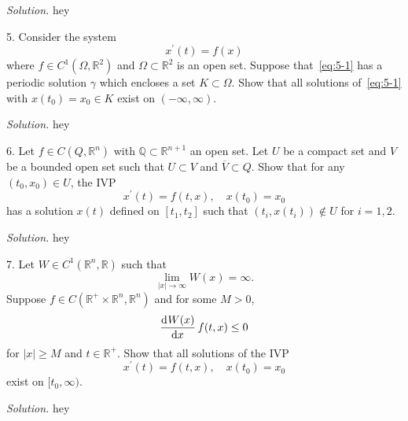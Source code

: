 \documentclass{article}
\newcommand{\Q}{\mathbb{Q}}
\newcommand{\R}{\mathbb{R}}
\begin{document}
\textit{Solution.}
hey

\newpage

5. Consider the system
%
\begin{equation}
    x^\prime(t) = f(x)
    \label{eq:5-1}
\end{equation}
%
where $f \in C^1(\Omega, \R^2)$ and $\Omega \subset \R^2$ is an open set. Suppose that~\eqref{eq:5-1}
has a periodic solution $\gamma$ which encloses a set $K \subset \Omega$. Show that all solutions
of~\eqref{eq:5-1} with $x(t_0) = x_0 \in K$ exist on $(- \infty, \infty)$.

\textit{Solution.}
hey

\newpage

6. Let $f \in C(Q, \R^n)$ with $\Q \subset \R^{n + 1}$ an open set. Let $U$ be a compact set and
$V$ be a bounded open set such that $U \subset V$ and $\overline{V} \subset Q$. Show that for any
$(t_0, x_0) \in U$, the IVP
%
\begin{equation*}
    x^\prime(t) = f(t, x), \quad x(t_0) = x_0
\end{equation*}
%
has a solution $x(t)$ defined on $[t_1, t_2]$ such that $(t_i, x(t_i)) \not\in U$ for $i = 1, 2$.

\textit{Solution.}
hey

\newpage

7. Let $W \in C^1(\R^n, \R)$ such that
%
\begin{equation*}
    \lim_{|x| \to \infty} W(x) = \infty
    .
\end{equation*}
%
Suppose $f \in C(\R^+ \times \R^n, \R^n)$ and for some $M > 0$,
%
\begin{equation*}
    \dod{W(x)}{x} f(t, x) \leq 0
\end{equation*}
%
for $|x| \geq M$ and $t \in \R^+$. Show that all solutions of the IVP
%
\begin{equation*}
    x^\prime(t) = f(t, x), \quad x(t_0) = x_0
\end{equation*}
%
exist on $[t_0, \infty)$.

\textit{Solution.}
hey
\end{document}
